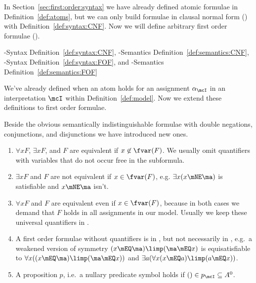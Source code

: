 

In Section~\ref{sec:first:order:syntax} we have already defined atomic formulae in Definition~\ref{def:atoms},
but we can only build formulae in clausal normal form (\CNF) with Definition~\vref{def:syntax:CNF}.
Now we will define arbitrary first order formulae (\FOF).

\CNF-Syntax Definition~\vref{def:syntax:CNF},
\CNF-Semantics Definition~\vref{def:semantics:CNF},
\FOF-Syntax Definition~\vref{def:syntax:FOF}, and
\FOF-Semantics Definition~\vref{def:semantics:FOF}



We've already defined when an atom holds for an assignment \( \alpha_\mcI \)
in an interpretation \( \mcI \) within Definition~\vref{def:model}.
Now we extend these definitions to first order formulae.


%
	Beside the obvious semantically indistinguishable formulae with double negations, conjunctions, and disjunctions
	we have introduced new ones.
	\begin{enumerate}
		\item \( \forall x F \), \( \exists x F \), and \( F \) are equivalent if \( x\not\in\fvar(F) \).
		We usually omit quantifiers with variables that do not occur free in the subformula.
		\item \( \exists x F \) and \( F \) are not equivalent if \( x\in\fvar(F) \),
		e.g. \( \exists x(x\mNE\ma) \) is satisfiable and \( x\mNE\ma \) isn't.
		\item \( \forall x F \) and \( F \) are equivalent even if \( x\in\fvar(F) \),
		because in both cases we demand that \( F \) holds in all assignments in our model.
		Usually we keep these universal quantifiers in \FOF{}.

		\item A first order formulae without quantifiers is in ,
		but not necessarily in \CNF, e.g.~a weakened version of symmetry \( (x\mEQ \ma)\limp (\ma\mEQ x) \)
		is equisatisfiable to \( \forall x ((x\mEQ \ma)\limp (\ma\mEQ x)) \)
		and \( \exists a (\forall x (x\mEQ a)\limp (a\mEQ x)) \).
		\item A proposition \( p \), i.e.~a nullary predicate symbol holds if \( ()\in p_\mcI \subseteq A^0 \).
	\end{enumerate}
